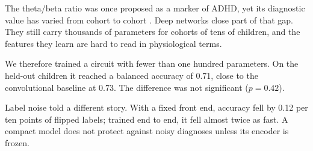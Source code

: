 The theta/beta ratio was once proposed as a marker of ADHD, yet its diagnostic value has varied from cohort to cohort \cite{arns2013}. Deep networks close part of that gap. They still carry thousands of parameters for cohorts of tens of children, and the features they learn are hard to read in physiological terms.

We therefore trained a circuit with fewer than one hundred parameters. On the held-out children it reached a balanced accuracy of 0.71, close to the convolutional baseline at 0.73. The difference was not significant ($p = 0.42$).

Label noise told a different story. With a fixed front end, accuracy fell by 0.12 per ten points of flipped labels; trained end to end, it fell almost twice as fast. A compact model does not protect against noisy diagnoses unless its encoder is frozen.
